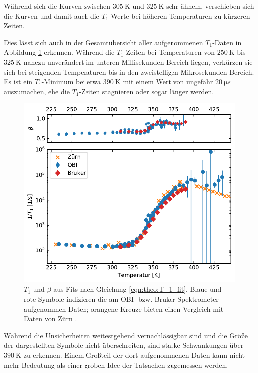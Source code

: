 Während sich die Kurven zwischen $\SI{305}{\kelvin}$ und $\SI{325}{\kelvin}$ sehr ähneln, verschieben sich die Kurven und damit auch die $T_1$-Werte bei höheren Temperaturen zu kürzeren Zeiten.

Dies lässt sich auch in der Gesamtübersicht aller aufgenommenen $T_1$-Daten in Abbildung \ref{fig:res:T_1} erkennen. Während die $T_1$-Zeiten bei Temperaturen von $\SI{250}{\kelvin}$ bis $\SI{325}{\kelvin}$ nahezu unverändert im unteren Millisekunden-Bereich liegen, verkürzen sie sich bei steigenden Temperaturen bis in den zweistelligen Mikrosekunden-Bereich. Es ist ein $T_1$-Minimum bei etwa $\SI{390}{\kelvin}$ mit einem Wert von ungefähr $\SI{20}{\micro s}$ auszumachen, ehe die $T_1$-Zeiten stagnieren oder sogar länger werden.
\begin{figure}
	\begin{center}
		\includegraphics[width=.9\textwidth]{graphics/plot/t1.pdf}
	\end{center}
	\caption{$T_1$ und $\beta$ aus Fits nach Gleichung \eqref{eqn:theo:T_1_fit}. Blaue und rote Symbole indizieren die am OBI- bzw. Bruker-Spektrometer aufgenommen Daten; orangene Kreuze bieten einen Vergleich mit Daten von Zürn \cite{zuern_paper}.} \label{fig:res:T_1}
\end{figure}

Während die Unsicherheiten weitestgehend vernachlässigbar sind und die Größe der dargestellten Symbole nicht überschreiten, sind starke Schwankungen über $\SI{390}{\kelvin}$ zu erkennen. Einem Großteil der dort aufgenommenen Daten kann nicht mehr Bedeutung als einer groben Idee der Tatsachen zugemessen werden.

